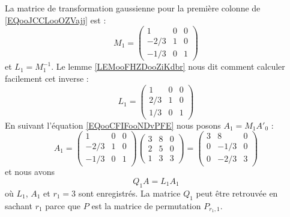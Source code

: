 \begin{example}
    La matrice de transformation gaussienne pour la première colonne de \eqref{EQooJCCLooOZVajj} est :
    \begin{equation}
        M_1=\begin{pmatrix}
            1    &   0    &   0    \\
            -2/3    &   1    &   0    \\
            -1/3    &   0    &   1
        \end{pmatrix}
    \end{equation}
    et \( L_1=M_1^{-1}\). Le lemme \ref{LEMooFHZDooZiKdbr} nous dit comment calculer facilement cet inverse :
    \begin{equation}
        L_1=\begin{pmatrix}
            1    &   0    &   0    \\
            2/3    &   1    &   0    \\
            1/3    &   0    &   1
        \end{pmatrix}
    \end{equation}
    En suivant l'équation \eqref{EQooCFIFooNDvPFE} nous posons \( A_1=M_1A'_0\) :
    \begin{equation}        \label{EQooUBRPooRJbCYn}
        A_1=
        \begin{pmatrix}
            1    &   0    &   0    \\
            -2/3    &   1    &   0    \\
            -1/3    &   0    &   1
        \end{pmatrix}
        \begin{pmatrix}
            3    &   8    &   0    \\
            2    &   5    &   0    \\
            1    &   3    &   3
        \end{pmatrix}=
        \begin{pmatrix}
            3    &   8    &   0    \\
            0    &   -1/3    &   0    \\
            0    &   -2/3    &   3
        \end{pmatrix}
    \end{equation}
    et nous avons 
    \begin{equation}
        Q_1A=L_1A_1
    \end{equation}
    où \( L_1\), \( A_1\) et \( r_1=3\) sont enregistrés. La matrice \( Q_1\) peut être retrouvée en sachant \( r_1\) parce que \( P\) est la matrice de permutation \( P_{r_1,1}\).


\end{example}
